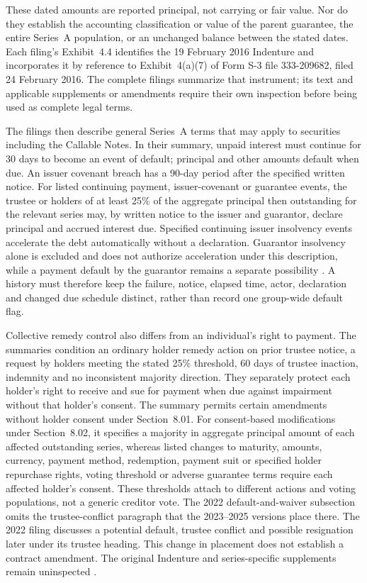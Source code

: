 These dated amounts are reported principal, not carrying or fair value. Nor do
they establish the accounting classification or value of the parent guarantee,
the entire Series~A population, or an unchanged balance between the stated
dates. Each filing's Exhibit~4.4 identifies the 19 February 2016 Indenture
and incorporates it by reference to Exhibit~4(a)(7) of Form S-3 file
333-209682, filed 24 February 2016. The complete filings summarize that
instrument; its text and applicable supplements or amendments require their
own inspection before being used as complete legal terms.

\newpage
The filings then describe general Series~A terms that may apply to securities
including the Callable Notes. In their summary, unpaid interest must continue
for 30 days to become an event of default; principal and other amounts default
when due. An issuer covenant breach has a 90-day period after the specified
written notice. For listed continuing payment, issuer-covenant or guarantee
events, the trustee or holders of at least 25\% of the aggregate principal
then outstanding for the relevant series may, by written notice to the issuer
and guarantor, declare principal and accrued interest due. Specified continuing
issuer insolvency events accelerate the debt automatically without a declaration. Guarantor insolvency
alone is excluded and does not authorize acceleration under this description,
while a payment default by the guarantor remains a separate possibility
\citep{jpmorgan2022tenk,jpmorgan2023tenk,jpmorgan2024tenk,jpmorgan2025tenk}.
A history must therefore keep the failure, notice, elapsed time, actor,
declaration and changed due schedule distinct, rather than record one
group-wide default flag.

Collective remedy control also differs from an individual's right to payment.
The summaries condition an ordinary holder remedy action on prior trustee
notice, a request by holders meeting the stated 25\% threshold, 60 days of
trustee inaction, indemnity and no inconsistent majority direction. They
separately protect each holder's right to receive and sue for payment when due
against impairment without that holder's consent. The summary permits certain
amendments without holder consent under Section~8.01. For consent-based
modifications under Section~8.02, it specifies a majority in aggregate
principal amount of each affected outstanding series, whereas
listed changes to maturity, amounts, currency, payment method, redemption,
payment suit or specified holder repurchase rights, voting threshold or adverse guarantee terms require each
affected holder's consent. These thresholds attach to different actions and
voting populations, not a generic creditor vote. The 2022 default-and-waiver
subsection omits the trustee-conflict paragraph that the 2023--2025 versions
place there. The 2022 filing discusses a potential default, trustee conflict
and possible resignation later under its trustee heading. This change in
placement does not establish a contract amendment. The original Indenture and
series-specific supplements remain uninspected
\citep{jpmorgan2022tenk,jpmorgan2023tenk,jpmorgan2024tenk,jpmorgan2025tenk}.

